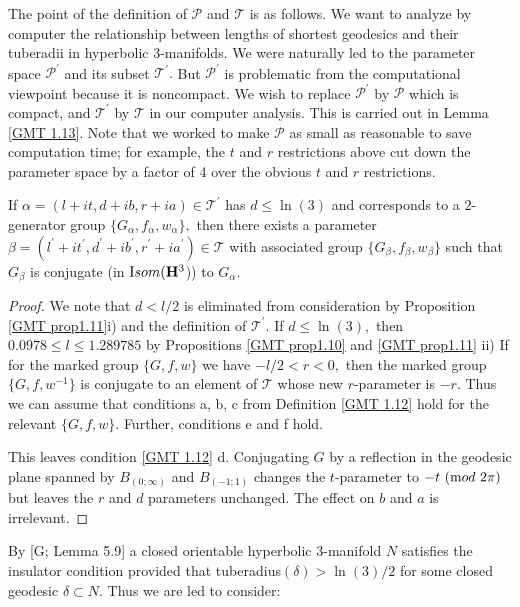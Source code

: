 The point of the definition of ${\mathcal P}$ and ${\mathcal T}$ is as follows.  We want to analyze by computer the relationship between lengths of shortest geodesics  and their tuberadii in hyperbolic $3$-manifolds.  We were naturally led to the parameter space 
${\mathcal P}^{\prime}$ and its subset ${\mathcal T}^{\prime}.$  But 
${\mathcal P}^{\prime}$ is problematic from the computational viewpoint because it is noncompact.  We wish to replace 
${\mathcal P}^{\prime}$ by ${\mathcal P}$ which is compact, and 
${\mathcal T}^{\prime}$ by ${\mathcal T}$ in our computer analysis.  This is carried out in Lemma \ref{GMT 1.13}.  Note that we worked to make ${\mathcal P}$ as small as reasonable to save computation time;  for example, the $t$ and $r$ restrictions above cut down the parameter space by a factor of 4 over the obvious $t$ and $r$ restrictions. 

\begin{lemma}\label{GMT 1.13}
If $\alpha=(l+it, d+ib, r+ia)\in {\mathcal T}^{\prime}$ has $d\le \ln(3)$ and
corresponds to a $2$\/{\textrm -}\/generator group
$\{G_\alpha,f_\alpha,w_\alpha\},$ then there exists a parameter $\beta=(l^{\prime}+it^{\prime}, d^{\prime}+ib^{\prime}, r^{\prime}+ia^{\prime})\in {\mathcal T}$ 
with associated group $\{G_\beta,f_\beta, w_\beta\}$ such that $G_\beta$ is conjugate (in ${\textrm Isom}({\mathbf H}^3$)) to $G_\alpha.$ 
\end{lemma}

\begin{proof} We note that $d < l/2$ is eliminated from consideration by
Proposition \ref{GMT prop1.11}i)
and the definition of ${\mathcal T}^\prime.$ If $d\le \ln(3),$
then
$0.0978\le l\le 1.289785$ by
Propositions \ref{GMT prop1.10} and \ref{GMT prop1.11} ii)
If for the marked group $\{G, f, w\}$ we have 
$-l/2<r<0,$ then the marked group
$\{G,f,w^{-1}\}$ is conjugate to an element of ${\mathcal T}$ whose new
$r$-parameter is $-r.$  Thus we can assume that
conditions a, b, c from Definition \ref{GMT 1.12} hold for the relevant $\{G,f,w\}.$  Further,    conditions e and f hold.

This leaves condition \ref{GMT 1.12} d.  Conjugating $G$ by a
reflection in the geodesic plane spanned
by $B_{(0;\infty)}$ and $B_{(-1;1)}$ changes the $t$-parameter to 
$-t \ ({\textrm mod}\ 2\pi)$
but leaves the $r$ and $d$ parameters unchanged.
The effect on $b$ and $a$ is irrelevant.  \end{proof}

By [G; Lemma 5.9]
a closed orientable hyperbolic $3$-manifold $N$
satisfies the insulator condition provided that
tuberadius$(\delta) > \ln(3)/2$ for some closed geodesic $\delta\subset N.$  Thus we
are led to consider:

